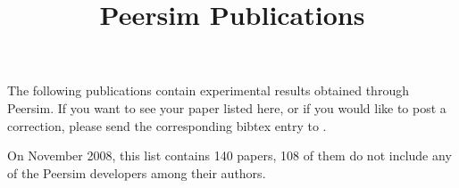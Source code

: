\documentclass{article}
\begin{document}
\title{Peersim Publications}

The following publications contain experimental results obtained through
Peersim. If you want to see your paper listed here, or if you would
like to post a correction, please send the corresponding bibtex entry 
to .

On November 2008, this list contains 140 papers, 108 of them do not include any of the Peersim developers
among their authors.

\nocite{*}



\end{document}
